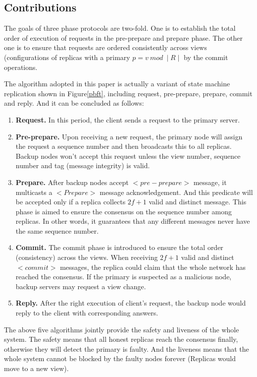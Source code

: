 \documentclass[conference]{IEEEtran}
\begin{document}
\subsection{Contributions}
The goals of three phase protocols are two-fold.
%
One is to establish the total order of execution of requests in the pre-prepare and prepare phase.
%
The other one is to ensure that requests are ordered consistently across views (configurations of replicas with a primary $p = v\ mod\ {\mid} R \mid$ by the commit operations.

The algorithm adopted in this paper is actually a variant of state machine replication shown in Figure\ref{pbft}, including request, pre-prepare, prepare, commit and reply.
%
And it can be concluded as follows:

\begin{enumerate}[label=(\roman*)]
    \item \textbf{Request.} In this period, the client sends a request to the primary server.
    \item \textbf{Pre-prepare.} Upon receiving a new request, the primary node will assign the request a sequence number and then broadcasts this to all replicas. 
    Backup nodes won't accept this request unless the view number, sequence number and tag (message integrity) is valid.
    \item \textbf{Prepare.} After backup nodes accept ${<}pre{-}prepare{>}$ message, it multicasts a ${<}Prepare{>}$ message acknowledgement.
    And this predicate will be accepted only if a replica collects $2f+1$ valid and distinct message. This phase is aimed to ensure the consensus on the sequence number among replicas. 
    In other words, it guarantees that any different messages never have the same sequence number.
    \item \textbf{Commit.} The commit phase is introduced to ensure the total order (consistency) across the views. 
    When receiving $2f+1$ valid and distinct ${<}commit{>}$ messages, the replica could claim that the whole network has reached the consensus.  
    If the primary is suspected as a malicious node, backup servers may request a view change. 
    \item \textbf{Reply.} After the right execution of client's request, the backup node would reply to the client with corresponding answers.
\end{enumerate}

The above five algorithms jointly provide the safety and liveness of the whole system.
%
The safety means that all honest replicas reach the consensus finally, otherwise they will detect the primary is faulty.
%
And the liveness means that the whole system cannot be blocked by the faulty nodes forever (Replicas would move to a new view).
\end{document}
